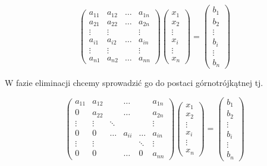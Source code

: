 \documentclass[11pt,wide]{mwart}
\begin{document}
$$
\left(\begin{matrix}
a_{11} & a_{12} & \ldots & a_{1n} \\
a_{21} & a_{22} & \ldots & a_{2n} \\
\vdots & \vdots & 		 & \vdots \\
a_{i1} & a_{i2} & \ldots & a_{in} \\
\vdots & \vdots & 		 & \vdots \\
a_{n1} & a_{n2} & \ldots & a_{nn}
\end{matrix}\right)
\left(\begin{matrix}
x_1 \\ x_2 \\ \vdots \\ x_i \\ \vdots \\ x_n
\end{matrix}\right) = 
\left(\begin{matrix}
b_1 \\ b_2 \\ \vdots \\ b_i \\ \vdots \\ b_n
\end{matrix}\right)
$$

\noindent W fazie eliminacji chcemy sprowadzić go do postaci górnotrójkątnej tj.

$$
\left(\begin{matrix}
a_{11} & a_{12} &  & \ldots  & & a_{1n} \\
0 & a_{22} &  & \ldots  & & a_{2n} \\
\vdots & \vdots & \ddots &		 & & \vdots \\
0 & 0 & \ldots & a_{ii}  & \ldots & a_{in} \\
\vdots & \vdots &  &		 & \ddots & \vdots \\
0 & 0 &  & \ldots  & 0 & a_{nn}
\end{matrix}\right)
\left(\begin{matrix}
x_1 \\ x_2 \\ \vdots \\ x_i \\ \vdots \\ x_n
\end{matrix}\right) = 
\left(\begin{matrix}
b_1 \\ b_2 \\ \vdots \\ b_i \\ \vdots \\ b_n
\end{matrix}\right)
$$
\end{document}
